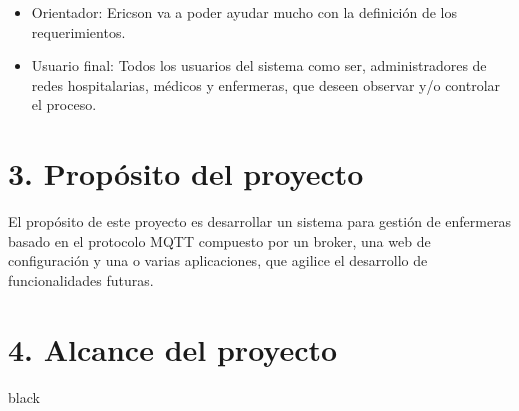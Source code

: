 \documentclass[
11pt, %
]{charter}
\begin{document}

 
\begin{itemize}
\item Orientador: Ericson va a poder ayudar mucho con la definición de los requerimientos.
\item Usuario final: Todos los usuarios del sistema como ser, administradores de redes hospitalarias, médicos y enfermeras, que deseen observar y/o controlar el proceso.

\end{itemize}





\section{3. Propósito del proyecto}
\label{sec:proposito}



El propósito de este proyecto es desarrollar un sistema para gestión de enfermeras basado en el protocolo MQTT compuesto por un broker, una web de configuración y una o varias aplicaciones, que agilice el desarrollo de funcionalidades futuras.



\section{4. Alcance del proyecto}
\label{sec:alcance}

{black}


\end{document}
